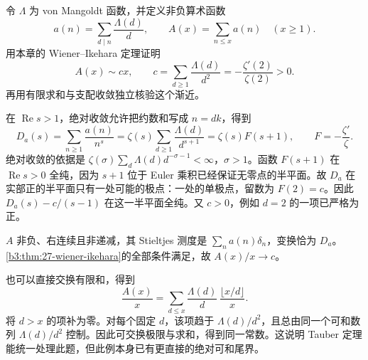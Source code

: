 \begin{exercise}\label{b3:ex:27-4}
令 \(\Lambda\) 为 von Mangoldt 函数，并定义非负算术函数
\[
 a(n)=\sum_{d\mid n}\frac{\Lambda(d)}d,\qquad
 A(x)=\sum_{n\le x}a(n)\quad(x\ge1).
\]
用本章的 Wiener--Ikehara 定理证明
\[
 A(x)\sim c x,\qquad
 c=\sum_{d\ge1}\frac{\Lambda(d)}{d^2}
   =-\frac{\zeta'(2)}{\zeta(2)}>0.
\]
再用有限求和与支配收敛独立核验这个渐近。
\end{exercise}
\begin{solution}
在 \(\operatorname{Re}s>1\)，绝对收敛允许把约数和写成 \(n=dk\)，得到
\[
 D_a(s)=\sum_{n\ge1}\frac{a(n)}{n^s}
 =\zeta(s)\sum_{d\ge1}\frac{\Lambda(d)}{d^{s+1}}
 =\zeta(s)F(s+1),
 \qquad F=-\frac{\zeta'}{\zeta}.
\]
绝对收敛的依据是
\(\zeta(\sigma)\sum_d\Lambda(d)d^{-\sigma-1}<\infty\)，\(\sigma>1\)。函数 \(F(s+1)\) 在 \(\operatorname{Re}s>0\) 全纯，因为 \(s+1\) 位于 Euler 乘积已经保证无零点的半平面。故 \(D_a\) 在实部正的半平面只有一处可能的极点：一处的单极点，留数为 \(F(2)=c\)。因此
\(D_a(s)-c/(s-1)\) 在这一半平面全纯。又 \(c>0\)，例如 \(d=2\) 的一项已严格为正。

\(A\) 非负、右连续且非递减，其 Stieltjes 测度是
\(\sum_n a(n)\delta_n\)，变换恰为 \(D_a\)。\cref{b3:thm:27-wiener-ikehara}的全部条件满足，故 \(A(x)/x\to c\)。

也可以直接交换有限和，得到
\[
 \frac{A(x)}x
 =\sum_{d\le x}\frac{\Lambda(d)}d\,\frac{\lfloor x/d\rfloor}{x}.
\]
将 \(d>x\) 的项补为零。对每个固定 \(d\)，该项趋于 \(\Lambda(d)/d^2\)，且总由同一个可和数列 \(\Lambda(d)/d^2\) 控制。因此可交换极限与求和，得到同一常数。这说明 Tauber 定理能统一处理此题，但此例本身已有更直接的绝对可和尾界。
\end{solution}

